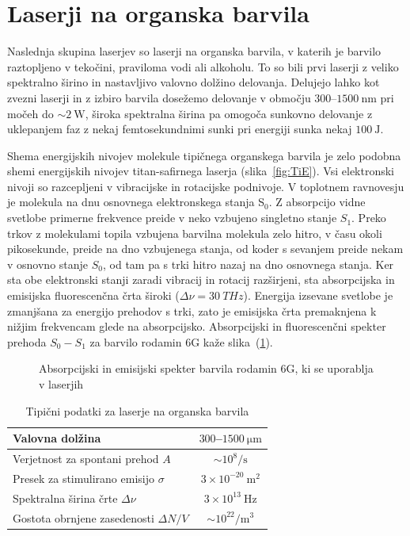 \section{Laserji na organska barvila}
Naslednja skupina laserjev so laserji na organska barvila, v katerih
je barvilo raztopljeno v tekočini, praviloma vodi ali alkoholu. 
To so bili prvi laserji z veliko spektralno širino in nastavljivo valovno dolžino
delovanja. Delujejo lahko kot zvezni laserji in z izbiro barvila dosežemo
delovanje v območju $300$--$1500~\si{\nano\metre}$ pri močeh do $\sim 2~\si{\watt}$, 
široka spektralna širina pa omogoča sunkovno delovanje z uklepanjem faz 
z nekaj femtosekundnimi sunki pri energiji sunka nekaj $100~\si{\joule}$.

Shema energijskih nivojev molekule tipičnega organskega barvila
je zelo podobna shemi energijskih nivojev titan-safirnega laserja (slika~\ref{fig:TiE}).
Vsi elektronski nivoji so razcepljeni v vibracijske in rotacijske podnivoje. 
V toplotnem ravnovesju je molekula na dnu osnovnega elektronskega stanja S$_0$. 
Z absorpcijo vidne svetlobe primerne frekvence preide v neko vzbujeno
singletno stanje $S_1$. Preko trkov z molekulami topila vzbujena barvilna molekula
zelo hitro, v času okoli pikosekunde, preide na dno vzbujenega stanja, od
koder s sevanjem preide nekam v osnovno stanje $S_0$, od tam pa s trki
hitro nazaj na dno osnovnega stanja. Ker
sta obe elektronski stanji zaradi vibracij in rotacij razširjeni, sta 
absorpcijska in emisijska fluorescenčna črta široki ($\Delta \nu = 30~\si{THz}$).
Energija izsevane svetlobe je zmanjšana za energijo
prehodov s trki, zato je emisijska črta premaknjena k nižjim
frekvencam glede na absorpcijsko. Absorpcijski in fluorescenčni spekter prehoda $S_0-S_1$
za barvilo rodamin 6G kaže slika~(\ref{fig:RhG}).

\begin{figure}[h]
\centering
\def\svgwidth{80truemm} 

\caption{Absorpcijski in emisijski spekter barvila rodamin 6G, ki se uporablja v laserjih}
\label{fig:RhG}
\end{figure} 

\begin{table}[h]
\begin{center}
\begin{tabular}{|l|c|}\hline
Valovna dolžina  & $300$--$1500~\si{\micro\meter}$\\ \hline
Verjetnost za spontani prehod $A$ & $ \sim 10^8/\si{\second}$ \\ \hline
Presek za stimulirano emisijo $\sigma$ & $3 \times 10^{-20}~\si{\metre}^2$ \\ \hline
Spektralna širina črte $\Delta \nu$ & $3 \times 10^{13}~\si{\hertz}$  \\ \hline
Gostota obrnjene zasedenosti $\Delta N/V$ & $ \sim 10^{22}/\si{\metre}^3$ \\ \hline
\end{tabular}
\caption{Tipični podatki za laserje na organska barvila}
\label{tab:orgb}
\end{center}
\end{table}

